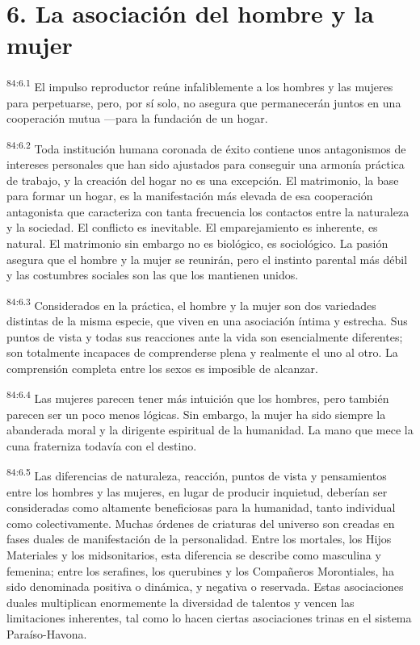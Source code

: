 \documentclass[twoside, 11pt]{book}
\begin{document}
\section*{6. La asociación del hombre y la mujer}
\par
\textsuperscript{84:6.1} El impulso reproductor reúne infaliblemente a los hombres y las mujeres para perpetuarse, pero, por sí solo, no asegura que permanecerán juntos en una cooperación mutua ---para la fundación de un hogar.

\par
\textsuperscript{84:6.2} Toda institución humana coronada de éxito contiene unos antagonismos de intereses personales que han sido ajustados para conseguir una armonía práctica de trabajo, y la creación del hogar no es una excepción. El matrimonio, la base para formar un hogar, es la manifestación más elevada de esa cooperación antagonista que caracteriza con tanta frecuencia los contactos entre la naturaleza y la sociedad. El conflicto es inevitable. El emparejamiento es inherente, es natural. El matrimonio sin embargo no es biológico, es sociológico. La pasión asegura que el hombre y la mujer se reunirán, pero el instinto parental más débil y las costumbres sociales son las que los mantienen unidos.

\par
\textsuperscript{84:6.3} Considerados en la práctica, el hombre y la mujer son dos variedades distintas de la misma especie, que viven en una asociación íntima y estrecha. Sus puntos de vista y todas sus reacciones ante la vida son esencialmente diferentes; son totalmente incapaces de comprenderse plena y realmente el uno al otro. La comprensión completa entre los sexos es imposible de alcanzar.

\par
\textsuperscript{84:6.4} Las mujeres parecen tener más intuición que los hombres, pero también parecen ser un poco menos lógicas. Sin embargo, la mujer ha sido siempre la abanderada moral y la dirigente espiritual de la humanidad. La mano que mece la cuna fraterniza todavía con el destino.

\par
\textsuperscript{84:6.5} Las diferencias de naturaleza, reacción, puntos de vista y pensamientos entre los hombres y las mujeres, en lugar de producir inquietud, deberían ser consideradas como altamente beneficiosas para la humanidad, tanto individual como colectivamente. Muchas órdenes de criaturas del universo son creadas en fases duales de manifestación de la personalidad. Entre los mortales, los Hijos Materiales y los midsonitarios, esta diferencia se describe como masculina y femenina; entre los serafines, los querubines y los Compañeros Morontiales, ha sido denominada positiva o dinámica, y negativa o reservada. Estas asociaciones duales multiplican enormemente la diversidad de talentos y vencen las limitaciones inherentes, tal como lo hacen ciertas asociaciones trinas en el sistema Paraíso-Havona.
\end{document}
